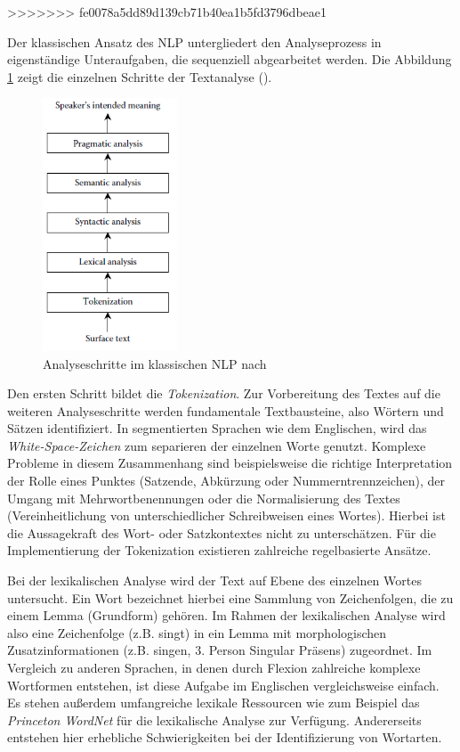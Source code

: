 >>>>>>> fe0078a5dd89d139cb71b40ea1b5fd3796dbeae1
\par
Der klassischen Ansatz des \ac{NLP} untergliedert den Analyseprozess in eigenständige Unteraufgaben, die sequenziell abgearbeitet werden. Die Abbildung \ref{fig:STEPS} zeigt die einzelnen Schritte der Textanalyse (\cite[vgl.][4]{DALE}). 
\par
\begin{figure}
\includegraphics[width=4cm]{pictures/Analyseschritte.png}
\caption{Analyseschritte im klassischen NLP nach \cite[vgl.][4]{DALE}}
\label{fig:STEPS}
\end{figure}
\par
Den ersten Schritt bildet die \textit{Tokenization}. Zur Vorbereitung des Textes auf die weiteren Analyseschritte werden fundamentale Textbausteine, also Wörtern und Sätzen identifiziert. In segmentierten Sprachen wie dem Englischen, wird das \textit{White-Space-Zeichen} zum separieren der einzelnen Worte genutzt. Komplexe Probleme in diesem Zusammenhang sind beispielsweise die richtige Interpretation der Rolle eines Punktes (Satzende, Abkürzung oder Nummerntrennzeichen), der Umgang mit Mehrwortbenennungen oder die Normalisierung des Textes (Vereinheitlichung von unterschiedlicher Schreibweisen eines Wortes). Hierbei ist die Aussagekraft des Wort- oder Satzkontextes nicht zu unterschätzen. Für die Implementierung der Tokenization existieren zahlreiche regelbasierte Ansätze.
\par
Bei der lexikalischen Analyse wird der Text auf Ebene des einzelnen Wortes untersucht. Ein Wort bezeichnet hierbei eine Sammlung von Zeichenfolgen, die zu einem Lemma (Grundform) gehören. Im Rahmen der lexikalischen Analyse wird also eine Zeichenfolge (z.B. singt) in ein Lemma mit morphologischen Zusatzinformationen (z.B. singen, 3. Person Singular Präsens) zugeordnet. Im Vergleich zu anderen Sprachen, in denen durch Flexion zahlreiche komplexe Wortformen entstehen, ist diese Aufgabe im Englischen vergleichsweise einfach. Es stehen außerdem umfangreiche lexikale Ressourcen wie zum Beispiel das \textit{Princeton WordNet} für die lexikalische Analyse zur Verfügung. Andererseits entstehen hier erhebliche Schwierigkeiten bei der Identifizierung von Wortarten.

